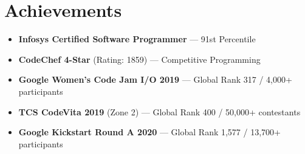 \documentclass[letterpaper,11pt]{article}
\newcommand{\resumeItem}[1]{
  \item\small{#1 \vspace{-2pt}}
}
\newcommand{\resumeSubItem}[1]{\resumeItem{#1}\vspace{-4pt}}
\newcommand{\resumeSubHeadingListStart}{\begin{itemize}[leftmargin=0.15in, label={}]}
\newcommand{\resumeSubHeadingListEnd}{\end{itemize}}
\begin{document}
\section{Achievements}
  \resumeSubHeadingListStart
    \resumeSubItem{\textbf{Infosys Certified Software Programmer} — 91st Percentile}
    \resumeSubItem{\textbf{CodeChef 4-Star} (Rating: 1859) — Competitive Programming}
    \resumeSubItem{\textbf{Google Women's Code Jam I/O 2019} — Global Rank 317 / 4,000+ participants}
    \resumeSubItem{\textbf{TCS CodeVita 2019} (Zone 2) — Global Rank 400 / 50,000+ contestants}
    \resumeSubItem{\textbf{Google Kickstart Round A 2020} — Global Rank 1,577 / 13,700+ participants}
  \resumeSubHeadingListEnd

\end{document}
